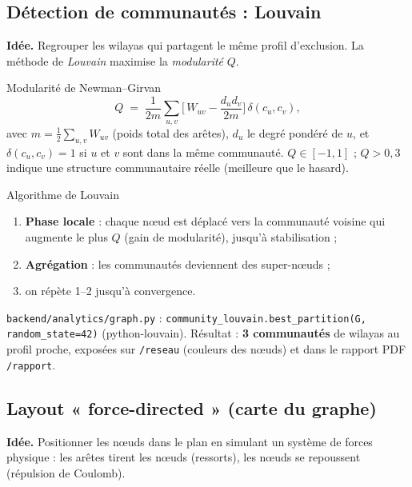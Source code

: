 \documentclass[11pt,a4paper]{article}
\newcommand{\txt}[1]{\texttt{#1}}
\begin{document}
\subsection{Détection de communautés : Louvain}

\textbf{Idée.} Regrouper les wilayas qui partagent le même profil
d'exclusion. La méthode de \emph{Louvain} maximise la \emph{modularité} $Q$.

\begin{meth}{Modularité de Newman--Girvan}
\[
Q \;=\; \frac{1}{2m}\sum_{u,v}
\Big[\,W_{uv} - \frac{d_u d_v}{2m}\Big]\,\delta(c_u,c_v),
\]
avec $m=\frac12\sum_{u,v}W_{uv}$ (poids total des arêtes), $d_u$ le degré
pondéré de $u$, et $\delta(c_u,c_v)=1$ si $u$ et $v$ sont dans la même
communauté. $Q\in[-1,1]$ ; $Q>0{,}3$ indique une structure communautaire
réelle (meilleure que le hasard).
\end{meth}

\begin{meth}{Algorithme de Louvain}
\begin{enumerate}[leftmargin=2em]
  \item \textbf{Phase locale} : chaque nœud est déplacé vers la communauté
        voisine qui augmente le plus $Q$ (gain de modularité), jusqu'à
        stabilisation ;
  \item \textbf{Agrégation} : les communautés deviennent des super-nœuds ;
  \item on répète 1--2 jusqu'à convergence.
\end{enumerate}
\end{meth}

\begin{where}
\txt{backend/analytics/graph.py} :
\txt{community\_louvain.best\_partition(G, random\_state=42)} (python-louvain).
Résultat : \textbf{3 communautés} de wilayas au profil proche, exposées sur
\txt{/reseau} (couleurs des nœuds) et dans le rapport PDF \txt{/rapport}.
\end{where}

\subsection{Layout « force-directed » (carte du graphe)}

\textbf{Idée.} Positionner les nœuds dans le plan en simulant un système de
forces physique : les arêtes tirent les nœuds (ressorts), les nœuds se
repoussent (répulsion de Coulomb).
\end{document}

